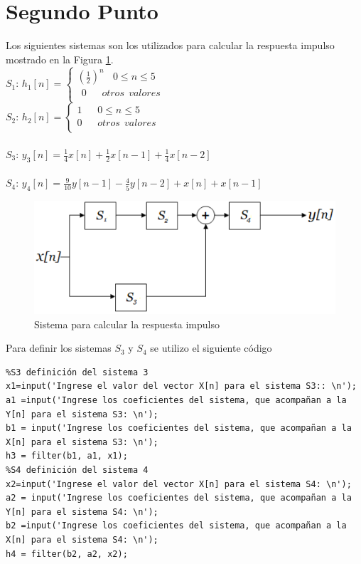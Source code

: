 \documentclass[onecolumn]{IEEEtran}
\begin{document}
\section{Segundo Punto}
\noindent
Los siguientes sistemas son los utilizados para calcular la respuesta impulso mostrado en la Figura \ref{fig1}.\\
$S_1$: $h_1 \left[ n \right] = \left\{ \begin{array}{l} \left( {\frac{1}{2}} \right)^n  \ \ \ \ 0 \le n \le 5 \\ \ \ 0 \ \ \ \ \ \ \ otros \ \ valores \\ \end{array} \right.$\\
$S_2$: $h_2 \left[ n \right] = \left\{ \begin{array}{l} 1 \ \ \ \ \ \ \ 0 \le n \le 5 \\ 0 \ \ \ \ \ \ \ otros \ \ valores \\ \end{array} \right.$\\\\
$S_3$: $y_3 \left[ n \right] = \frac{1}{4}x\left[ n \right] + \frac{1}{2}x\left[ {n - 1} \right] + \frac{1}{4}x\left[ {n - 2} \right]$\\\\
$S_4$: $y_4 \left[ n \right] = \frac{9}{{10}}y\left[ {n - 1} \right] - \frac{4}{5}y\left[ {n - 2} \right] + x\left[ n \right] + x\left[ {n - 1} \right]$\\
\begin{figure}[H]
	\centering
		\includegraphics[scale=0.6]{sys.png}
	\caption{Sistema para calcular la respuesta impulso}
    \label{fig1}
\end{figure}
\noindent
Para definir los sistemas $S_3$ y $S_4$ se utilizo el siguiente código
\begin{verbatim}
%S3 definición del sistema 3
x1=input('Ingrese el valor del vector X[n] para el sistema S3:: \n');
a1 =input('Ingrese los coeficientes del sistema, que acompañan a la Y[n] para el sistema S3: \n');
b1 = input('Ingrese los coeficientes del sistema, que acompañan a la X[n] para el sistema S3: \n');
h3 = filter(b1, a1, x1);
%S4 definición del sistema 4
x2=input('Ingrese el valor del vector X[n] para el sistema S4: \n');
a2 = input('Ingrese los coeficientes del sistema, que acompañan a la Y[n] para el sistema S4: \n');
b2 =input('Ingrese los coeficientes del sistema, que acompañan a la X[n] para el sistema S4: \n');
h4 = filter(b2, a2, x2);
\end{verbatim}
\end{document}
